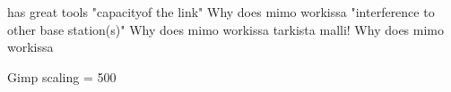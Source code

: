 has great tools
"capacityof the link" Why does mimo workissa
"interference to other base station(s)" Why does mimo workissa
tarkista malli!  Why does mimo workissa

Gimp scaling = 500 
